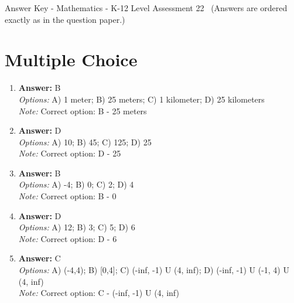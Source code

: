 \documentclass[12pt]{article}
\begin{document}
\begin{center}
Answer Key - Mathematics - K-12 Level Assessment 22 \
\small (Answers are ordered exactly as in the question paper.)
\end{center}

\section*{Multiple Choice}
\begin{enumerate}[label=\arabic*.]
\item \textbf{Answer:} B
\\ \textit{Options:} A) 1 meter; B) 25 meters; C) 1 kilometer; D) 25 kilometers
\\ \textit{Note:} Correct option: B - 25 meters
\item \textbf{Answer:} D
\\ \textit{Options:} A) 10; B) 45; C) 125; D) 25
\\ \textit{Note:} Correct option: D - 25
\item \textbf{Answer:} B
\\ \textit{Options:} A) -4; B) 0; C) 2; D) 4
\\ \textit{Note:} Correct option: B - 0
\item \textbf{Answer:} D
\\ \textit{Options:} A) 12; B) 3; C) 5; D) 6
\\ \textit{Note:} Correct option: D - 6
\item \textbf{Answer:} C
\\ \textit{Options:} A) (-4,4); B) [0,4]; C) (-inf, -1) U (4, inf); D) (-inf, -1) U (-1, 4) U (4, inf)
\\ \textit{Note:} Correct option: C - (-inf, -1) U (4, inf)
\end{enumerate}
\end{document}

